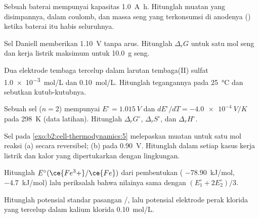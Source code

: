 \begin{exercise}[$\star$]\label{exo:b2:cell-thermodynamics:2}
Sebuah baterai mempunyai kapasitas \qty{1.0}{A.h}. Hitunglah muatan yang
disimpannya, dalam coulomb, dan massa seng yang terkonsumsi di anodenya
() ketika baterai itu habis seluruhnya.
\end{exercise}

\begin{exercise}[$\star$]\label{exo:b2:cell-thermodynamics:3}
Sel Daniell memberikan \qty{1.10}{V} tanpa arus. Hitunglah $\Delta_r G$
untuk satu mol seng dan kerja listrik maksimum untuk \qty{10.0}{g} seng.
\end{exercise}

\begin{exercise}[$\star$]\label{exo:b2:cell-thermodynamics:4}
Dua elektrode tembaga tercelup dalam larutan tembaga(II) sulfat
\qty{1.0e-3}{mol/L} dan \qty{0.10}{mol/L}. Hitunglah tegangannya pada
\qty{25}{\degreeCelsius} dan sebutkan kutub-kutubnya.
\end{exercise}

\begin{exercise}[$\star\star$]\label{exo:b2:cell-thermodynamics:5}
Sebuah sel ($n = 2$) mempunyai $E^\circ = \qty{1.015}{V}$ dan
$dE^\circ/dT = \qty{-4.0e-4}{V/K}$ pada \qty{298}{K} (data latihan).
Hitunglah $\Delta_r G^\circ$, $\Delta_r S^\circ$, dan $\Delta_r H^\circ$.
\end{exercise}

\begin{exercise}[$\star\star$]\label{exo:b2:cell-thermodynamics:6}
Sel pada \cref{exo:b2:cell-thermodynamics:5} melepaskan muatan untuk satu
mol reaksi (a) secara reversibel; (b) pada \qty{0.90}{V}. Hitunglah dalam
setiap kasus kerja listrik dan kalor yang dipertukarkan dengan lingkungan.
\end{exercise}

\begin{exercise}[$\star\star$]\label{exo:b2:cell-thermodynamics:7}
Hitunglah $E^\circ(\ce{Fe^3+}/\ce{Fe})$ dari  pembentukan
( \qty{-78.90}{kJ/mol},  \qty{-4.7}{kJ/mol}) lalu
periksalah bahwa nilainya sama dengan $(E_1^\circ + 2E_2^\circ)/3$.
\end{exercise}

\begin{exercise}[$\star\star$]\label{exo:b2:cell-thermodynamics:8}
Hitunglah potensial standar pasangan /, lalu potensial
elektrode perak klorida yang tercelup dalam kalium klorida
\qty{0.10}{mol/L}.
\end{exercise}

